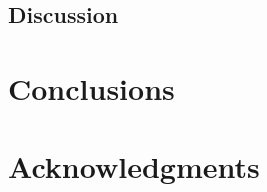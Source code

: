 \documentclass{acm_proc_article-sp}
\begin{document}
\subsection{Discussion}


\section{Conclusions}


\section{Acknowledgments}



%
%
\end{document}
